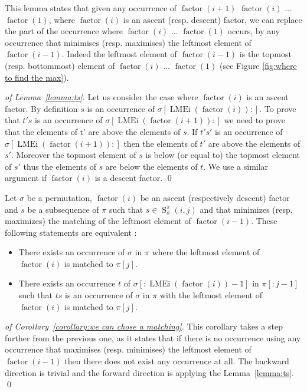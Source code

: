 \documentclass[a4paper]{llncs}
\newcommand{\ptext}{\pi}
\newcommand{\ppattern}{\sigma}
\DeclareMathOperator{\LMEi}{LMEi}
\DeclareMathOperator{\factor}{factor}
\DeclareMathOperator{\SETa}{S}
\newcommand{\SET}[4]{\SETa_{{#1}}^{{#2}}({#3},{#4})}
\begin{document}
This lemma states that given any occurrence of $\factor(i+1)$ $\factor(i)$ $\ldots$ $\factor(1)$,
where $\factor(i)$ is an ascent (resp. descent) factor,
we can replace the part of the occurrence where $\factor(i)$ $\ldots$ $\factor(1)$ occurs, by any occurrence
that minimises (resp. maximises) the leftmost element of $\factor(i-1)$. Indeed the leftmost element of $\factor(i-1)$ is the topmost (resp. bottommost) element of  $\factor(i)$ $\ldots$ $\factor(1)$ (see Figure \ref{fig:where to find the max}). 

\begin{proof}[of Lemma~\ref{lemma:ts}]
Let us consider the case where $\factor(i)$ is an ascent factor.
By definition $s$ is an occurrence of $\ppattern[\LMEi(\factor(i)):]$. To prove that $t's$ is an occurrence of $\ppattern[\LMEi(\factor(i+1)):]$ we need to prove that the elements of t' are above the elements of $s$. If $t's'$ is an occurrence of $\ppattern[\LMEi(\factor(i+1)):]$ then the elements of $t'$ are above the elements of $s'$. Moreover the topmost element of $s$ is below (or equal to) the topmost element of $s'$ thus the elements of $s$ are below the elements of $t$. We use a similar argument if $\factor(i)$ is a descent factor.
\qed
\end{proof}

\begin{corollary}
\label{corollary:we can chose a matching}	
Let $\ppattern$ be a permutation, 
$\factor(i)$ be an ascent (respectively descent) factor
and 
$s$ be a subsequence of $\pi$ such that $s \in \SET{\ppattern}{\ptext}{i}{j}$ and
that minimizes (resp. maximizes) the matching of the leftmost element of $\factor(i-1)$.
These following statements are equivalent :
\begin{itemize}
	\item There exists an occurrence
	 of $\ppattern$ in $\ptext$ where the leftmost element of $\factor(i)$ is matched to $\ptext[j]$.
	\item There exists an occurrence $t$ of $\sigma[:\LMEi(\factor(i))-1]$ in $\ptext[:j-1]$  such that $ts$ is an occurrence of $\ppattern$ in $\ptext$ with the leftmost element of $\factor(i)$ is matched to $\ptext[j]$.
\end{itemize}
\end{corollary}

\begin{proof}[of Corollary~\ref{corollary:we can chose a matching}]
This corollary takes a step further from the previous one, as it states that if there is no occurrence using any occurrence that maximises (resp. minimises) the leftmost element of $\factor(i-1)$ then there does not exist any occurrence at all. The backward direction is trivial and the forward direction is applying the Lemma~\ref{lemma:ts}. 
\qed
\end{proof}
\end{document}
